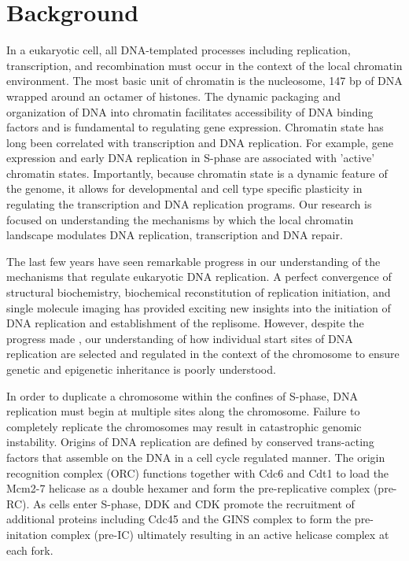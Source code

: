 \section{Background}
In a eukaryotic cell, all DNA-templated processes including replication, transcription, and recombination must occur in the context of the local chromatin environment.  The most basic unit of chromatin is the nucleosome, 147 bp of DNA wrapped around an octamer of histones\citep{McGinty2015-kd}.  The dynamic packaging and organization of DNA into chromatin facilitates accessibility of DNA binding factors and is fundamental to regulating gene expression\citep{Kouzarides2007-sk}. Chromatin state has long been correlated with transcription and DNA replication\citep{Stambrook1970-jm,Goldman1984-im}.  For example, gene expression and early DNA replication in S-phase are associated with 'active' chromatin states\citep{Rhind2013-yr}. Importantly, because chromatin state is a dynamic feature of the genome, it allows for developmental and cell type specific plasticity in regulating the transcription and DNA replication programs\citep{Goren2008-wr}.  Our research is focused on understanding the mechanisms by which the local chromatin landscape modulates DNA replication, transcription and DNA repair.

The last few years have seen remarkable progress in our understanding of the mechanisms that regulate eukaryotic DNA replication.  A perfect convergence of structural biochemistry\citep{Bleichert2015-zl}, biochemical reconstitution of replication initiation\citep{Yeeles2015-pe}, and single molecule imaging\citep{Ticau2015-gg} has provided exciting new insights into the initiation of DNA replication and establishment of the replisome.  However, despite the progress made \invitro, our understanding of how individual start sites of DNA replication are selected and regulated in the context of the chromosome to ensure genetic and epigenetic inheritance is poorly understood\citep{Prioleau2016-bj}. 

In order to duplicate a chromosome within the confines of S-phase, DNA replication must begin at multiple sites along the chromosome.  Failure to completely replicate the chromosomes may result in catastrophic genomic instability\citep{Green2010-ht}.  Origins of DNA replication are defined by conserved trans-acting factors that assemble on the DNA in  a cell cycle regulated manner. %
The origin recognition complex (ORC) functions together with Cdc6 and Cdt1 to load the Mcm2-7 helicase as a double hexamer and form the pre-replicative complex (pre-RC)\citep{Bell2013-pk}.%
As cells enter S-phase, DDK and CDK promote the recruitment of additional proteins including Cdc45 and the GINS complex to form the pre-initation complex (pre-IC)\citep{Tanaka2013-fl} ultimately resulting in an active helicase complex at each fork.   

